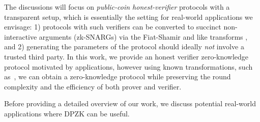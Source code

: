 \begin{itemize}
{	The discussions will focus on {\em public-coin honest-verifier} protocols with a transparent setup, 
	which is essentially the setting for real-world applications we envisage: 
	1) protocols with such verifiers can be converted to succinct non-interactive arguments (zk-SNARGs) via 
	the Fiat-Shamir and like transforms \cite{FS86, BCS16}, and 2) generating the parameters of the protocol should 
	ideally {\em not} involve a trusted third party. 
	In this work, we provide an honest verifier zero-knowledge protocol motivated by applications, 
	however using known transformations, such as~\cite{hubavcek2018efficiency}, 
	we can obtain a zero-knowledge protocol while preserving the round complexity and the efficiency of both prover and verifier.
	}
\end{itemize}
Before providing a detailed overview of our work, we discuss potential real-world applications where DPZK can be useful. 


\UPDATED{}

